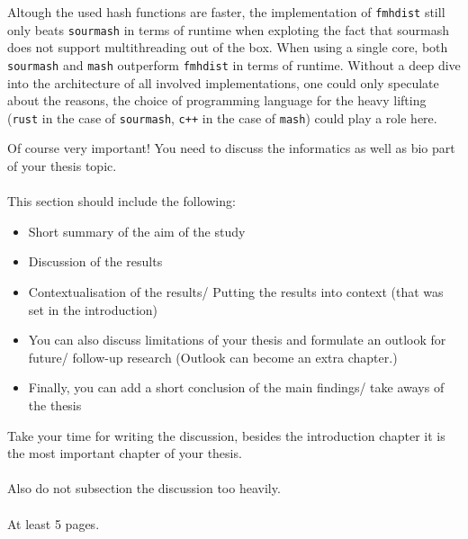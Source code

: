 Altough the used hash functions are faster, the implementation of
\texttt{fmhdist} still only beats \texttt{sourmash} in terms of runtime when
exploting the fact that sourmash does not support multithreading out of the box.
When using a single core, both \texttt{sourmash} and \texttt{mash} outperform
\texttt{fmhdist} in terms of runtime. Without a deep dive into the architecture
of all involved implementations, one could only speculate about the reasons, the
choice of programming language for the heavy lifting (\texttt{rust} in the case
of \texttt{sourmash}, \texttt{c++} in the case of \texttt{mash}) could play a
role here. 

Of course very important! You need to discuss the informatics as well as bio part of your thesis topic.\\\\
This section should include the following:
\begin{itemize}
  \item Short summary of the aim of the study
  \item Discussion of the results
  \item Contextualisation of the results/ Putting the results into context (that was set in the introduction)
  \item You can also discuss limitations of your thesis and formulate an outlook for future/ follow-up research (Outlook can become an extra chapter.)
  \item Finally, you can add a short conclusion of the main findings/ take aways of the thesis
\end{itemize}
Take your time for writing the discussion, besides the introduction chapter it is the most important chapter of your thesis.\\\\
Also do not subsection the discussion too heavily.\\\\
At least 5 pages.